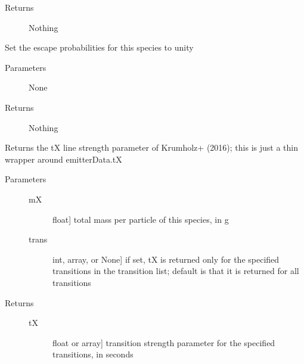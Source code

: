 \documentclass[letterpaper,10pt,english]{sphinxmanual}
\begin{document}
\begin{fulllineitems}
\begin{fulllineitems}
\begin{description}
\begin{description}
\end{description}

\item[{Returns}] \leavevmode
Nothing

\end{description}

\end{fulllineitems}


\begin{fulllineitems}
\label{fulldoc:despotic.emitter.setThin}
Set the escape probabilities for this species to unity
\begin{description}
\item[{Parameters}] \leavevmode
None

\item[{Returns}] \leavevmode
Nothing

\end{description}

\end{fulllineitems}


\begin{fulllineitems}
\label{fulldoc:despotic.emitter.tX}
Returns the tX line strength parameter of Krumholz+ (2016);
this is just a thin wrapper around emitterData.tX
\begin{description}
\item[{Parameters}] \leavevmode\begin{description}
\item[{mX}] \leavevmode{[}float{]}
total mass per particle of this species, in g

\item[{trans}] \leavevmode{[}int, array, or None{]}
if set, tX is returned only for the specified
transitions in the transition list; default is that it
is returned for all transitions

\end{description}

\item[{Returns}] \leavevmode\begin{description}
\item[{tX}] \leavevmode{[}float or array{]}
transition strength parameter for the specified
transitions, in seconds

\end{description}

\end{description}

\end{fulllineitems}


\end{fulllineitems}
\end{document}
